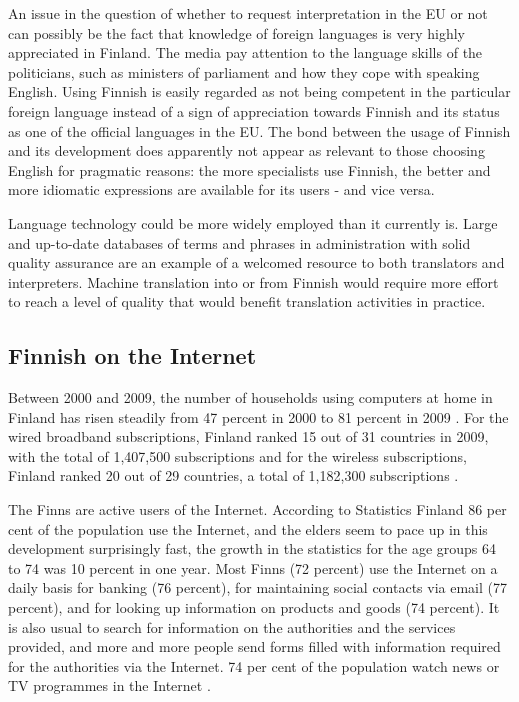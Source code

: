 \documentclass[]{../../metanetpaper}
\begin{document}
\begin{multicols}{2}
An issue in the question of whether to request interpretation in the
EU or not can possibly be the fact that knowledge of foreign languages
is very highly appreciated in Finland. The media pay attention to the
language skills of the politicians, such as ministers of parliament
and how they cope with speaking English. Using Finnish is easily
regarded as not being competent in the particular foreign language
instead of a sign of appreciation towards Finnish and its status as
one of the official languages in the EU. The bond between the usage of
Finnish and its development does apparently not appear as relevant to
those choosing English for pragmatic reasons: the more specialists use
Finnish, the better and more idiomatic expressions are available for
its users - and vice versa.

Language technology could be more widely employed than it currently
is. Large and up-to-date databases of terms and phrases in
administration with solid quality assurance are an example of a
welcomed resource to both translators and interpreters. Machine
translation into or from Finnish would require more effort to reach a
level of quality that would benefit translation activities in
practice.
\subsection{Finnish on the Internet}

Between 2000 and 2009, the number of households using computers at
home in Finland has risen steadily from 47 percent in 2000 to 81
percent in 2009 \cite{OECD-ICT}. For the wired broadband
subscriptions, Finland ranked 15 out of 31 countries in 2009, with the
total of 1,407,500 subscriptions \cite{OECD-wired} and for the
wireless subscriptions, Finland ranked 20 out of 29 countries, a total
of 1,182,300 subscriptions \cite{OECD-mobile}.

The Finns are active users of the Internet. According to Statistics
Finland 86 per cent of the population use the Internet, and the elders
seem to pace up in this development surprisingly fast, the growth in
the statistics for the age groups 64 to 74 was 10 percent in one
year. Most Finns (72 percent) use the Internet on a daily basis for
banking (76 percent), for maintaining social contacts via email (77
percent), and for looking up information on products and goods (74
percent). It is also usual to search for information on the
authorities and the services provided, and more and more people send
forms filled with information required for the authorities via the
Internet. 74 per cent of the population watch news or TV programmes in
the Internet \cite{SVT}.


\end{multicols}
\end{document}
